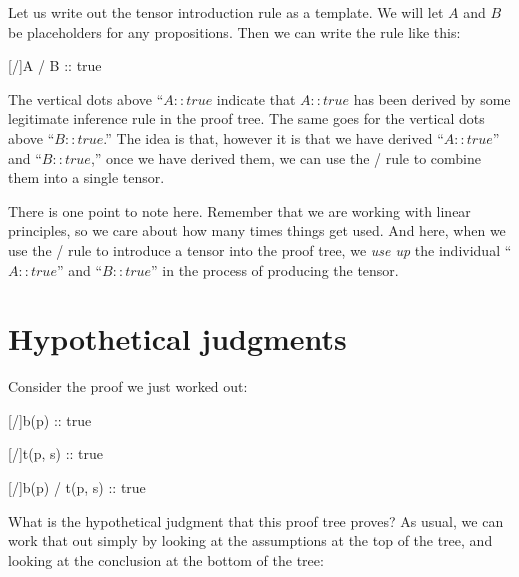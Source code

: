 \documentclass[../../../main.tex]{subfiles}
\begin{document}
Let us write out the tensor introduction rule as a template. We will let $A$ and $B$ be placeholders for any propositions. Then we can write the rule like this:

\begin{prooftree*}
  \hypo{}
  \ellipsis{}{}

  \hypo{}
  \ellipsis{}{}

  [\tensorIntro/]{A \tensor/ B :: true}
\end{prooftree*}

\noindent
The vertical dots above ``$A :: true$ indicate that $A :: true$ has been derived by some legitimate inference rule in the proof tree. The same goes for the vertical dots above ``$B :: true$.'' The idea is that, however it is that we have derived ``$A :: true$'' and ``$B :: true$,'' once we have derived them, we can use the \tensorIntro/ rule to combine them into a single tensor.

There is one point to note here. Remember that we are working with linear principles, so we care about how many times things get used.  And here, when we use the \tensorIntro/ rule to introduce a tensor into the proof tree, we \emph{use up} the individual ``$A :: true$'' and ``$B :: true$'' in the process of producing the tensor. 


\section{Hypothetical judgments}

Consider the proof we just worked out:

\begin{prooftree*}
  \hypo{}
  [\startrule/]{b(p) :: true}
  
  \hypo{}
  [\startrule/]{t(p, s) :: true}
  
  [\tensorIntro/]{b(p) \tensor/ t(p, s) :: true}
\end{prooftree*}

\noindent
What is the hypothetical judgment that this proof tree proves? As usual, we can work that out simply by looking at the assumptions at the top of the tree, and looking at the conclusion at the bottom of the tree:
\end{document}
